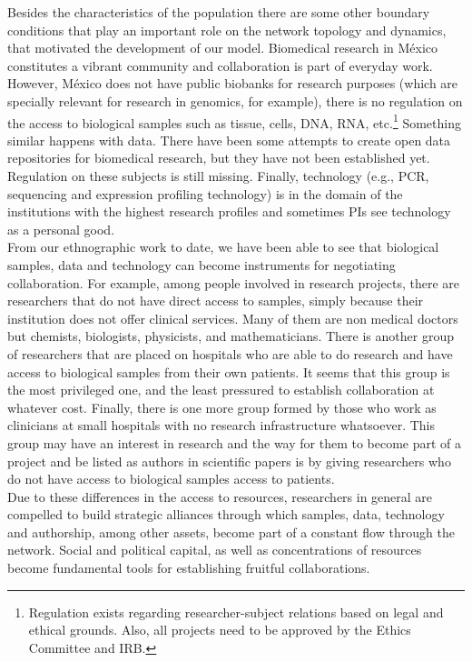 \documentclass[11pt]{article}
\begin{document}
Besides the characteristics of the population there are some other boundary
conditions that play an important role on the network topology and dynamics,
that motivated the development of our model. Biomedical research in M\'exico
constitutes a vibrant community and collaboration is part of everyday
work. However, M\'exico does not have public biobanks for research purposes
(which are specially relevant for research in genomics, for example), there is
no regulation on the access to biological samples such as tissue, cells, DNA,
RNA, etc.\footnote{Regulation exists regarding researcher-subject relations
  based on legal and ethical grounds. Also, all projects need to be approved by
  the Ethics Committee and IRB.} Something similar happens with data. There have
been some attempts to create open data repositories for biomedical research, but
they have not been established yet. Regulation on these subjects is still
missing. Finally, technology (e.g., PCR, sequencing and expression profiling
technology) is in the domain of the institutions with the highest research
profiles and sometimes PIs see technology as a personal good.\\  

From our ethnographic work to date, we have been able to see that
biological samples, data and technology can become instruments for negotiating
collaboration. For example, among people involved in research projects, there
are researchers that do not have direct access to samples, simply because their
institution does not offer clinical services. Many of them are non medical
doctors but chemists, biologists, physicists, and mathematicians. There is
another group of researchers that are placed on hospitals who are able to do
research and have access to biological samples from their own patients. It seems
that this group is the most privileged one, and the least pressured to establish
collaboration at whatever cost. Finally, there is one more group formed by those
who work as clinicians at small hospitals with no research infrastructure
whatsoever. This group may have an interest in research and the way for them to
become part of a project and be listed as authors in scientific papers is by
giving researchers who do not have access to biological samples access to
patients.\\

Due to these differences in the access to resources, researchers in
general are compelled to build strategic alliances through which samples, data,
technology and authorship, among other assets, become part of a constant flow through
the network. Social and political capital, as well as concentrations of
resources become fundamental tools for establishing fruitful collaborations. 
\end{document}
